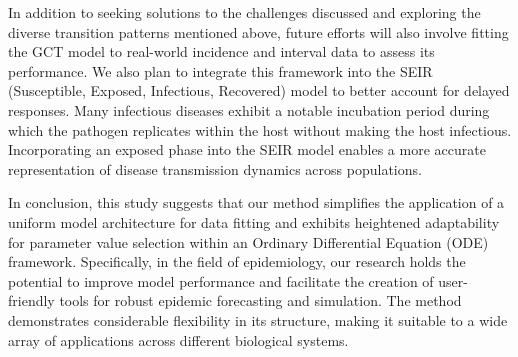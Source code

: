 \documentclass[12pt]{article}
\begin{document}
In addition to seeking solutions to the challenges discussed and exploring the diverse transition patterns mentioned above, future efforts will also involve fitting the GCT model to real-world incidence and interval data to assess its performance. We also plan to integrate this framework into the SEIR (Susceptible, Exposed, Infectious, Recovered) model to better account for delayed responses. Many infectious diseases exhibit a notable incubation period during which the pathogen replicates within the host without making the host infectious. Incorporating an exposed phase into the SEIR model enables a more accurate representation of disease transmission dynamics across populations.

In conclusion, this study suggests that our method simplifies the application of a uniform model architecture for data fitting and exhibits heightened adaptability for parameter value selection within an Ordinary Differential Equation (ODE) framework. Specifically, in the field of epidemiology, our research holds the potential to improve model performance and facilitate the creation of user-friendly tools for robust epidemic forecasting and simulation. The method demonstrates considerable flexibility in its structure, making it suitable to a wide array of applications across different biological systems. 


 
\end{document}
